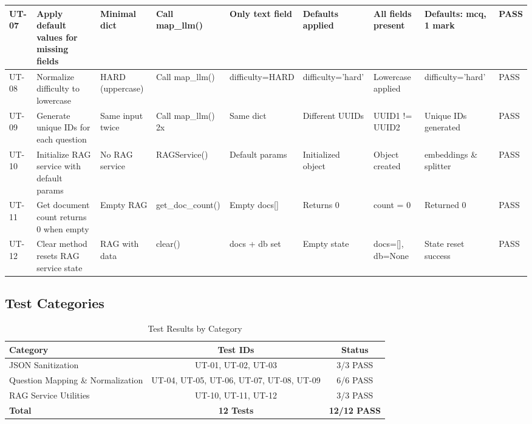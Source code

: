\documentclass{article}
\begin{document}
\begin{longtable}{|p{0.8cm}|p{4cm}|p{2cm}|p{2cm}|p{2.5cm}|p{2cm}|p{2cm}|p{2.5cm}|p{0.8cm}|}
UT-07 & Apply default values for missing fields & Minimal dict & Call map\_llm() & Only text field & Defaults applied & All fields present & Defaults: mcq, 1 mark & \cellcolor{green!30} PASS \\
\hline

UT-08 & Normalize difficulty to lowercase & HARD (uppercase) & Call map\_llm() & difficulty=HARD & difficulty='hard' & Lowercase applied & difficulty='hard' & \cellcolor{green!30} PASS \\
\hline

UT-09 & Generate unique IDs for each question & Same input twice & Call map\_llm() 2x & Same dict & Different UUIDs & UUID1 != UUID2 & Unique IDs generated & \cellcolor{green!30} PASS \\
\hline

UT-10 & Initialize RAG service with default params & No RAG service & RAGService() & Default params & Initialized object & Object created & embeddings \& splitter & \cellcolor{green!30} PASS \\
\hline

UT-11 & Get document count returns 0 when empty & Empty RAG & get\_doc\_count() & Empty docs[] & Returns 0 & count = 0 & Returned 0 & \cellcolor{green!30} PASS \\
\hline

UT-12 & Clear method resets RAG service state & RAG with data & clear() & docs + db set & Empty state & docs=[], db=None & State reset success & \cellcolor{green!30} PASS \\
\hline

\end{longtable}

\subsection*{Test Categories}

\begin{table}[h]
\centering
\begin{tabular}{|l|c|c|}
\hline
\rowcolor{gray!30}
\textbf{Category} & \textbf{Test IDs} & \textbf{Status} \\
\hline
JSON Sanitization & UT-01, UT-02, UT-03 & \cellcolor{green!30} 3/3 PASS \\
\hline
Question Mapping \& Normalization & UT-04, UT-05, UT-06, UT-07, UT-08, UT-09 & \cellcolor{green!30} 6/6 PASS \\
\hline
RAG Service Utilities & UT-10, UT-11, UT-12 & \cellcolor{green!30} 3/3 PASS \\
\hline
\textbf{Total} & \textbf{12 Tests} & \cellcolor{green!30} \textbf{12/12 PASS} \\
\hline
\end{tabular}
\caption{Test Results by Category}
\end{table}
\end{document}
